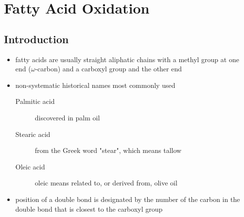 \documentclass{scrartcl}
\begin{document}
\section{Fatty Acid Oxidation}
\label{sec:orgda5fc8e}
\subsection{Introduction}
\label{sec:org5c8731e}
\begin{itemize}
\item fatty acids are usually straight aliphatic chains with a methyl
group at one end (\(\omega\)-carbon) and a carboxyl group and the other
end
\end{itemize}


\begin{itemize}
\item non-systematic historical names most commonly used
\begin{description}
\item[{Palmitic acid}] discovered in palm oil
\item[{Stearic acid}] from the Greek word "stear", which means tallow
\item[{Oleic acid}] oleic means related to, or derived from, olive oil
\end{description}
\item position of a double bond is designated by the number of the carbon in the double bond that is closest to the carboxyl group
\end{itemize}
\end{document}
